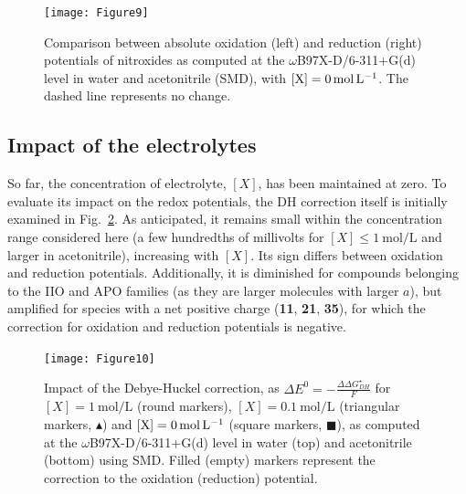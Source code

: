 \documentclass[review]{elsarticle}
\begin{document}
\begin{figure}[!h]
	\centering
	\texttt{[image: Figure9]}
	\caption{Comparison between absolute oxidation (left) and reduction (right) potentials of nitroxides as computed at the $\omega$B97X-D/6-311+G(d) level in water and acetonitrile (SMD), with $[\ce{X}]=\SI{0}{\mole\per\liter}$. The dashed line represents no change. }
	\label{fig:watvsac}
\end{figure}

\subsection{Impact of the electrolytes} \label{sec:elect}

So far, the concentration of electrolyte, $[X]$, has been maintained at zero. To evaluate its impact on the redox potentials, the DH correction itself is initially examined in Fig.~\ref{fig:DH}. As anticipated, it remains small within the concentration range considered here (a few hundredths of millivolts for $[X] \leq \SI{1}{\mole\per\liter}$ and larger in acetonitrile), increasing with $[X]$. Its sign differs between oxidation and reduction potentials. Additionally, it is diminished for compounds belonging to the IIO and APO families (as they are larger molecules with larger $a$), but amplified for species with a net positive charge (\textbf{11}, \textbf{21}, \textbf{35}), for which the correction for oxidation and reduction potentials is negative.


\begin{figure}[!h]
	\centering
	\texttt{[image: Figure10]}
	\caption{Impact of the Debye-Huckel correction, as $\Delta E^0 = -\frac{\Delta \Delta G_{DH}^\star}{F}$ for $[X]=\SI{1}{\mole\per\liter}$ (round markers), $[X]=\SI{0.1}{\mole\per\liter}$ (triangular markers, $\blacktriangle$)  and $[\ce{X}]=\SI{0}{\mole\per\liter}$ (square markers, $\blacksquare$), as computed at the $\omega$B97X-D/6-311+G(d) level in water (top) and acetonitrile (bottom) using SMD. Filled (empty) markers represent the correction to the oxidation (reduction) potential. }
	\label{fig:DH}
\end{figure}
\end{document}

